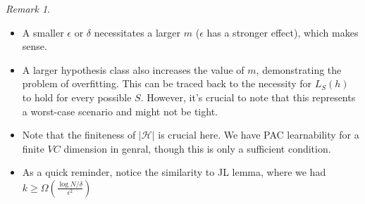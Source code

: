 \documentclass[11pt,reqno]{amsart}
\theoremstyle{remark}
\newtheorem{remark}[example]{Remark}
\begin{document}
\begin{remark}
\begin{itemize}
\item A smaller $\epsilon$ or $\delta$ necessitates a larger $m$ ($\epsilon$ has a stronger effect), which makes sense.
\item A larger hypothesis class also increases the value of $m$, demonstrating the problem of overfitting. This can be traced back to the necessity for $L_S(h)$ to hold for every possible $S$. However, it's crucial to note that this represents a worst-case scenario and might not be tight.
\item Note that the finiteness of $\lvert \mathcal{H}\rvert$ is crucial here. We have PAC learnability for a finite $VC$ dimension in genral, though this is only a sufficient condition.
\item As a quick reminder, notice the similarity to JL lemma, where we had $k\geq\Omega(\frac{\log N/\delta}{\epsilon^2})$
\end{itemize}
\end{remark}
\end{document}
